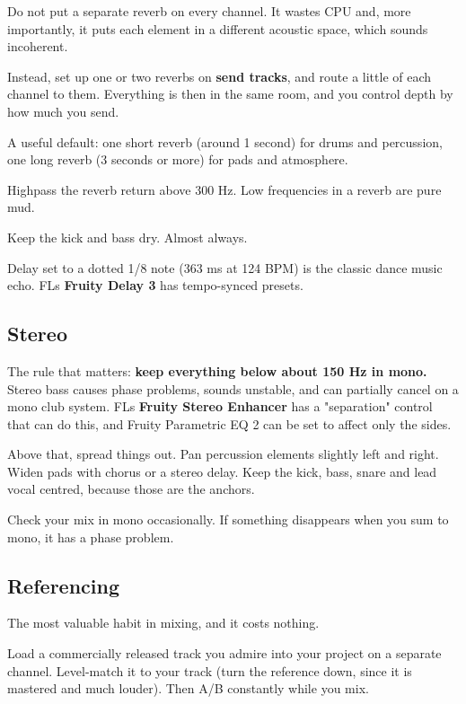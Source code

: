 Do not put a separate reverb on every channel. It wastes CPU and, more importantly, it puts
each element in a different acoustic space, which sounds incoherent.

Instead, set up one or two reverbs on \textbf{send tracks}, and route a little of each channel to
them. Everything is then in the same room, and you control depth by how much you send.

A useful default: one short reverb (around 1 second) for drums and percussion, one long
reverb (3 seconds or more) for pads and atmosphere.

Highpass the reverb return above 300 Hz. Low frequencies in a reverb are pure mud.

Keep the kick and bass dry. Almost always.

Delay set to a dotted 1/8 note (363 ms at 124 BPM) is the classic dance music echo. FL\textquotesingle s
\textbf{Fruity Delay 3} has tempo-synced presets.

\subsection{Stereo}\label{th07_mixing-stereo}

The rule that matters: \textbf{keep everything below about 150 Hz in mono.} Stereo bass causes
phase problems, sounds unstable, and can partially cancel on a mono club system. FL\textquotesingle s
\textbf{Fruity Stereo Enhancer} has a "separation" control that can do this, and Fruity
Parametric EQ 2 can be set to affect only the sides.

Above that, spread things out. Pan percussion elements slightly left and right. Widen pads
with chorus or a stereo delay. Keep the kick, bass, snare and lead vocal centred, because
those are the anchors.

Check your mix in mono occasionally. If something disappears when you sum to mono, it has a
phase problem.

\subsection{Referencing}\label{th07_mixing-referencing}

The most valuable habit in mixing, and it costs nothing.

Load a commercially released track you admire into your project on a separate channel.
Level-match it to your track (turn the reference down, since it is mastered and much louder).
Then A/B constantly while you mix.

